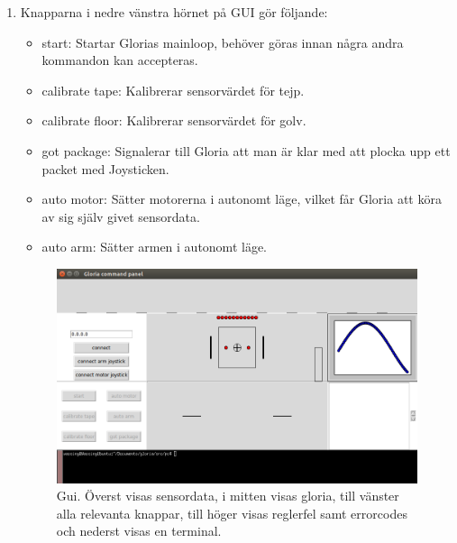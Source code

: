 \begin{enumerate}
\begin{itemize}
	\end{itemize}
	\item Knapparna i nedre vänstra hörnet på GUI gör följande:
	\begin{itemize}
		\item start: Startar Glorias mainloop, behöver göras innan några andra kommandon kan accepteras.
		\item calibrate tape: Kalibrerar sensorvärdet för tejp.
		\item calibrate floor: Kalibrerar sensorvärdet för golv.
		\item got package: Signalerar till Gloria att man är klar med att plocka upp ett packet med Joysticken.
		\item auto motor: Sätter motorerna i autonomt läge, vilket får Gloria att köra av sig själv givet sensordata.
		\item auto arm: Sätter armen i autonomt läge.
	\end{itemize}
	\begin{figure}[h]
	\center
	\includegraphics[scale=0.6]{Gui.png}
	\endcenter
	\caption{Gui. Överst visas sensordata, i mitten visas gloria, till vänster alla relevanta knappar, till höger visas reglerfel samt errorcodes och nederst visas en terminal.}
	\end{figure}
\end{enumerate}
